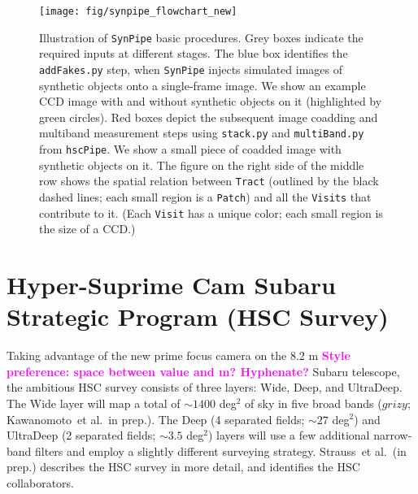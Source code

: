 \documentclass[useamsfonts]{pasj01}
\def\etal{{\ et al.~}}
\def\hscpipe{\texttt{hscPipe}}
\def\synpipe{\texttt{SynPipe}}
\def\tract{\texttt{Tract}}
\def\visit{\texttt{Visit}}
\def\visits{\texttt{Visits}}
\newcommand{\susan}[1]{\textcolor{magenta} {\textbf{#1}}}
\begin{document}
\begin{figure}
    \begin{center}
        \texttt{[image: fig/synpipe\_flowchart\_new]}
    \end{center}
    \caption{
        Illustration of  \synpipe{} basic procedures.
        Grey  boxes indicate the required inputs at different stages.
        The blue box identifies the \texttt{addFakes.py} step, when \synpipe{} injects simulated
        images of synthetic objects onto a single-frame image. 
        We show an example CCD image with and without synthetic objects on it
        (highlighted by green circles).
        Red boxes depict the subsequent image coadding and multiband measurement steps
        using \texttt{stack.py} and \texttt{multiBand.py} from \hscpipe{}.
        We show a small piece of coadded image with synthetic objects on it.
        The figure on the right side of the middle row shows the spatial relation
        between \tract{} (outlined by the black dashed lines; each small region
        is a \texttt{Patch}) and all the \visits{} that contribute to it. (Each \visit{} has a  unique color; each small region is the size
        of a CCD.)
        }
    \label{fig:flowchart}
\end{figure}

\section{Hyper-Suprime Cam Subaru Strategic Program (HSC Survey)}
    \label{sec:ssp}

    Taking advantage of the new prime focus camera on the 8.2 m \susan{Style preference: space between value and m? Hyphenate?} Subaru telescope,
    the ambitious HSC survey consists of three layers: Wide, Deep, and UltraDeep.
    The Wide layer will map a total of ${\sim}1400$ deg$^2$ of sky in five broad bands
    ($grizy$; Kawanomoto\etal in prep.).
    The Deep (4 separated fields; ${\sim}27$ deg$^2$) and UltraDeep (2 separated
    fields; ${\sim}3.5$ deg$^2$) layers will use a few additional narrow-band filters
    and employ a slightly different surveying strategy.
     Strauss\etal (in prep.) describes the HSC survey in more detail, and identifies the HSC collaborators.
  
\end{document}
